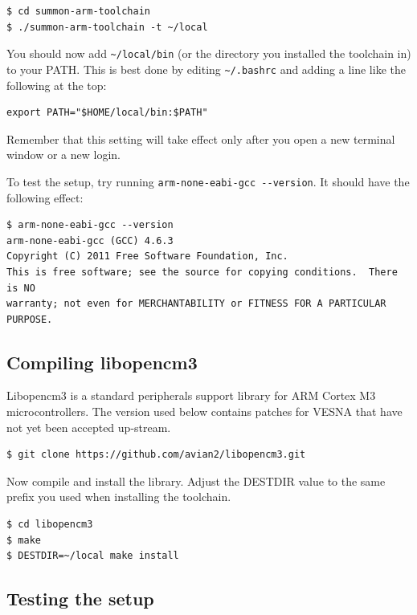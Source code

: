 \documentclass[a4paper, 10pt]{article}
\begin{document}
\begin{verbatim}
$ cd summon-arm-toolchain
$ ./summon-arm-toolchain -t ~/local
\end{verbatim}

You should now add \verb|~/local/bin| (or the directory you installed the toolchain
in) to your PATH. This is best done by editing \verb|~/.bashrc| and adding a
line like the following at the top:

\begin{verbatim}
export PATH="$HOME/local/bin:$PATH"
\end{verbatim}

Remember that this setting will take effect only after you open a new terminal window or
a new login.

To test the setup, try running \verb|arm-none-eabi-gcc --version|. It should have the
following effect:

\begin{verbatim}
$ arm-none-eabi-gcc --version
arm-none-eabi-gcc (GCC) 4.6.3
Copyright (C) 2011 Free Software Foundation, Inc.
This is free software; see the source for copying conditions.  There is NO
warranty; not even for MERCHANTABILITY or FITNESS FOR A PARTICULAR PURPOSE.
\end{verbatim}

\subsection{Compiling libopencm3}

Libopencm3 is a standard peripherals support library for ARM Cortex M3
microcontrollers. The version used below contains patches for VESNA that have
not yet been accepted up-stream.

\begin{verbatim}
$ git clone https://github.com/avian2/libopencm3.git
\end{verbatim}

Now compile and install the library. Adjust the DESTDIR value to the same prefix
you used when installing the toolchain.

\begin{verbatim}
$ cd libopencm3
$ make
$ DESTDIR=~/local make install
\end{verbatim}

\subsection{Testing the setup}
\end{document}
